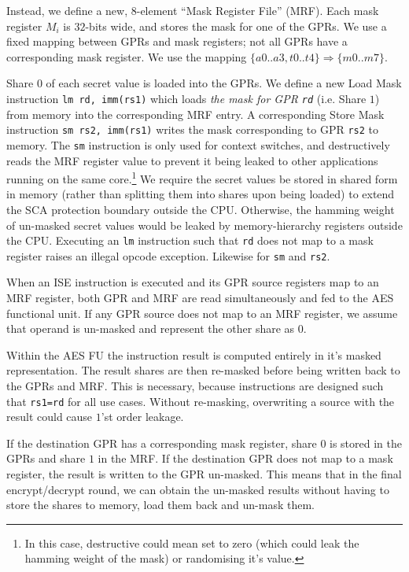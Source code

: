 Instead, we define a new, $8$-element ``Mask Register File'' (MRF).
Each mask register $M_i$ is $32$-bits wide, and stores the mask for
one of the GPRs.
We use a fixed mapping between GPRs and mask registers;
not all GPRs have a corresponding mask register.
We use the mapping $\{a0..a3,t0..t4\} \Rightarrow \{m0..m7\}$.

Share $0$ of each secret value is loaded into the GPRs.
We define a new Load Mask instruction {\tt lm rd, imm(rs1)} which
loads {\em the mask for GPR {\tt rd}}
(i.e. Share $1$)
from memory into the corresponding MRF entry.
A corresponding Store Mask instruction {\tt sm rs2, imm(rs1)} writes
the mask corresponding to GPR {\tt rs2} to memory.
The {\tt sm} instruction is only used for context switches, and
destructively reads the MRF register value to prevent it being
leaked to other applications running on the same core.\footnote{
    In this case, destructive could mean set to zero (which could
    leak the hamming weight of the mask) or randomising it's value.}
We require the secret values be stored in shared form in memory
(rather than splitting them into shares upon being loaded)
to extend the SCA protection boundary outside the CPU.
Otherwise, the hamming weight of un-masked secret values would be
leaked by memory-hierarchy registers outside the CPU.
Executing an {\tt lm} instruction such that {\tt rd} does not map to
a mask register raises an illegal opcode exception.
Likewise for {\tt sm} and {\tt rs2}.

When an ISE instruction is executed and its GPR source
registers map to an MRF register, both GPR and MRF are
read simultaneously and fed to the AES functional unit.
If any GPR source does not map to an MRF register, we assume that
operand is un-masked and represent the other share as $0$.

Within the AES FU the instruction result is computed entirely in it's
masked representation.
The result shares are then re-masked before being written back to the
GPRs and MRF.
This is necessary, because  instructions are designed
such that {\tt rs1=rd} for all use cases.
Without re-masking, overwriting a source with the result could cause 
$1$'st order leakage.

If the destination GPR has a corresponding
mask register, share $0$ is stored in the GPRs and share $1$ in the MRF.
If the destination GPR does not map to a mask register, the result is written
to the GPR un-masked.
This means that in the final encrypt/decrypt round, we can obtain
the un-masked results without having to store the shares to memory,
load them back and un-mask them.

